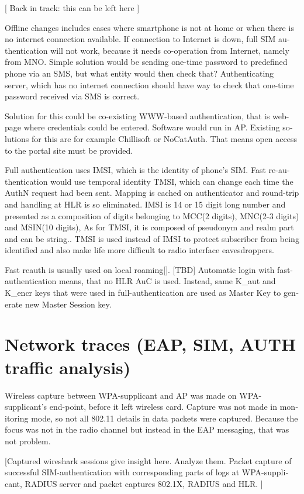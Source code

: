 \documentclass[12pt,a4paper,english]{tutthesis}
\begin{document}
\begin{otherlanguage}{english}
[ Back in track: this can be left here ]

Offline changes includes cases where smartphone is not at home or when
there is no internet connection available.
If connection to Internet is down, full SIM authentication will not
work, because it needs co-operation from Internet, namely from MNO.
Simple solution would be sending one-time password to predefined
phone via an SMS, but what entity would then check that?
Authenticating server, which has no internet connection should 
have way to check that one-time password received via SMS is correct.

Solution for this could be co-existing WWW-based authentication, that
is web-page where credentials could be entered.
Software would run in AP. Existing solutions for this are for example
Chillisoft or NoCatAuth. That means open access to the
portal site must be provided.


Full authentication uses IMSI, which is the identity of phone's SIM.
Fast re-authentication would use temporal identity TMSI, which 
can change each time the AuthN request had been sent. Mapping
is cached on authenticator and round-trip and handling at HLR is
so eliminated. 
IMSI is 14 or 15 digit long number and presented as a composition
of digits belonging to MCC(2 digits), MNC(2-3 digits) and MSIN(10 digits),
As for TMSI, it is composed of pseudonym and realm part and can be string..
TMSI is used instead of IMSI to protect subscriber from being
identified and also make life more difficult to radio interface
eavesdroppers\cite{imsi-tmsi}.

Fast reauth is usually used on
local roaming[\cite{xxx}]. [TBD]
Automatic login with fast-authentication means, that no HLR AuC
is used. Instead, same K\_aut and K\_encr keys  that were used in full-authentication are used  as Master Key to generate new Master Session key.\cite[p.30]{rfc4186}


\section{Network traces (EAP, SIM, AUTH traffic analysis)}
\label{sec-5-4}
Wireless capture between WPA-supplicant and AP was made on
WPA-supplicant's end-point, before it left wireless card. Capture was
not made in monitoring mode, so not all 802.11 details in
data packets were captured\cite{wireshark-capture}.  Because the focus was not in the
radio channel but instead in the EAP messaging, that was not problem.


[Captured wireshark sessions give insight here. Analyze them.
Packet capture of successful SIM-authentication with corresponding
parts of logs at WPA-supplicant, RADIUS server and packet captures 
802.1X, RADIUS and HLR. ]


\end{otherlanguage}
\end{document}
